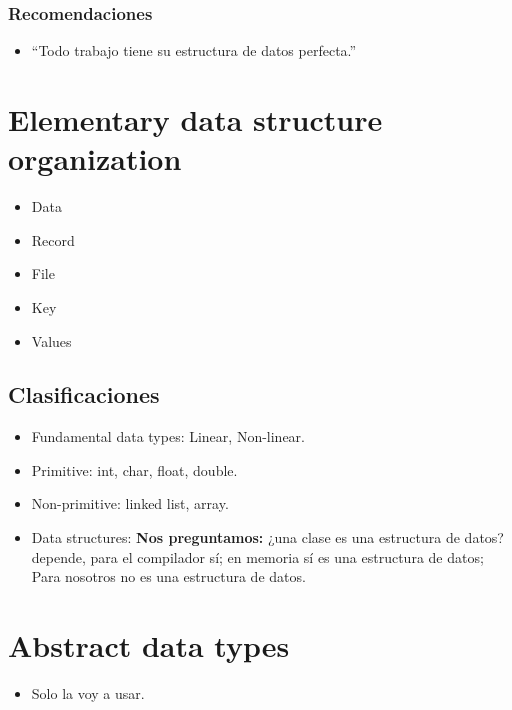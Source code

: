 
\subsubsection{Recomendaciones}
\begin{itemize}
    \item ``Todo trabajo tiene su estructura de datos perfecta.''
\end{itemize}


\section{Elementary data structure organization}
\begin{itemize}
    \item Data 
    \item Record 
    \item File
    \item Key 
    \item Values 
\end{itemize}


\subsection{Clasificaciones}
\begin{itemize}
    \item Fundamental data types: Linear, Non-linear.
    \item Primitive:  int, char, float, double.
    \item Non-primitive: linked list, array.
    \item Data structures: \textbf{Nos preguntamos:} ¿una clase es una estructura de datos? depende, para el compilador sí; en memoria sí es una estructura de datos; Para nosotros no es una estructura de datos.
\end{itemize}


\section{Abstract data types}
\begin{itemize}
    \item Solo la voy a usar.
\end{itemize}

